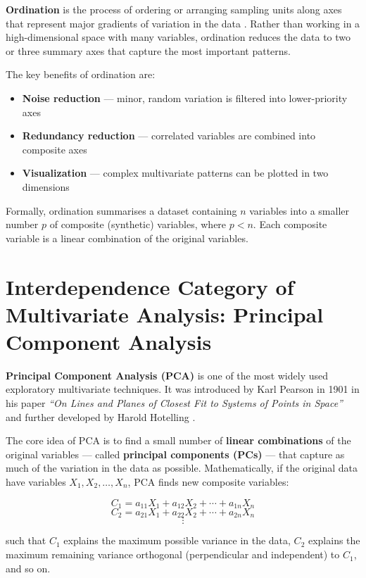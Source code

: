 \documentclass[
]{book}
\providecommand{\tightlist}{%
  \setlength{\itemsep}{0pt}\setlength{\parskip}{0pt}}
\begin{document}
\textbf{Ordination} is the process of ordering or arranging sampling units along axes that represent major gradients of variation in the data \citep{gotelli2013}. Rather than working in a high-dimensional space with many variables, ordination reduces the data to two or three summary axes that capture the most important patterns.

The key benefits of ordination are:

\begin{itemize}
\tightlist
\item
  \textbf{Noise reduction} --- minor, random variation is filtered into lower-priority axes
\item
  \textbf{Redundancy reduction} --- correlated variables are combined into composite axes
\item
  \textbf{Visualization} --- complex multivariate patterns can be plotted in two dimensions
\end{itemize}

Formally, ordination summarises a dataset containing \(n\) variables into a smaller number \(p\) of composite (synthetic) variables, where \(p < n\). Each composite variable is a linear combination of the original variables.

\section{Interdependence Category of Multivariate Analysis: Principal Component Analysis}\label{interdependence-category-of-multivariate-analysis-principal-component-analysis}

\textbf{Principal Component Analysis (PCA)} is one of the most widely used exploratory multivariate techniques. It was introduced by Karl Pearson in 1901 \citep{Pearson1901} in his paper \emph{``On Lines and Planes of Closest Fit to Systems of Points in Space''} and further developed by Harold Hotelling \citep{Hotelling1933}.

The core idea of PCA is to find a small number of \textbf{linear combinations} of the original variables --- called \textbf{principal components (PCs)} --- that capture as much of the variation in the data as possible. Mathematically, if the original data have variables \(X_1, X_2, \ldots, X_n\), PCA finds new composite variables:

\[C_1 = a_{11}X_1 + a_{12}X_2 + \cdots + a_{1n}X_n\]
\[C_2 = a_{21}X_1 + a_{22}X_2 + \cdots + a_{2n}X_n\]
\[\vdots\]

such that \(C_1\) explains the maximum possible variance in the data, \(C_2\) explains the maximum remaining variance orthogonal (perpendicular and independent) to \(C_1\), and so on.
\end{document}

